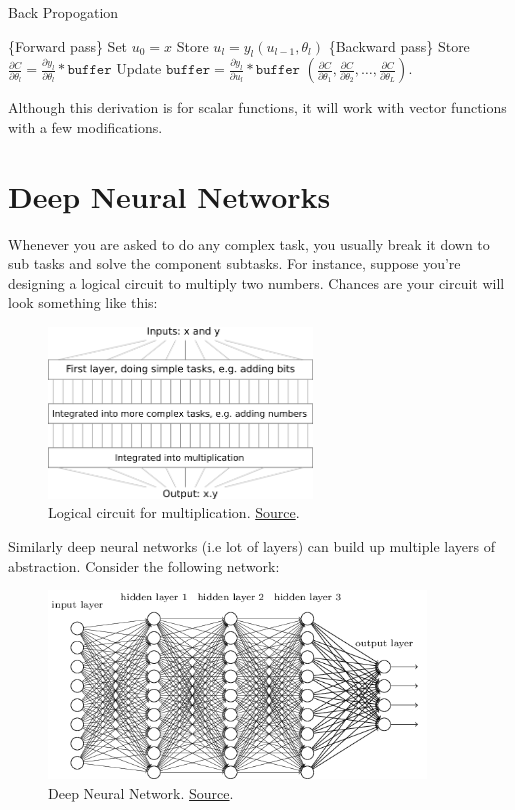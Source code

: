 \documentclass[a4paper]{tufte-handout}
\begin{document}
\begin{algorithm}[H]
\caption{Back Propogation}
\begin{algorithmic}[1]
  \STATE \{Forward pass\}
  \STATE Set \(u_0 = x\)
  	\STATE Store \(u_l = y_l(u_{l-1}, \theta_l)\)
  \ENDFOR
  \STATE \{Backward pass\}
  	\STATE Store \(\frac{\partial C}{\partial \theta_l} = \frac{\partial y_l}{\partial \theta_l} * \texttt{buffer}\)
  	\STATE Update \(\texttt{buffer} = \frac{\partial y_l}{\partial u_l} * \texttt{buffer}\)
  \ENDFOR 
  \RETURN \(\left(\frac{\partial C}{\partial\theta_1}, \frac{\partial C}{\partial\theta_2}, \ldots, \frac{\partial C}{\partial\theta_L}\right)\).
\end{algorithmic}
\end{algorithm}


Although this derivation is for scalar functions, it will work with
vector functions with a few modifications.

\section{Deep Neural Networks}\label{deep-neural-networks}

Whenever you are asked to do any complex task, you usually break it down
to sub tasks and solve the component subtasks. For instance, suppose
you're designing a logical circuit to multiply two numbers. Chances are
your circuit will look something like this:

\begin{figure}
\includegraphics[width=70mm]{circuit_multiplication}
\caption{Logical circuit for multiplication.
\href{http://neuralnetworksanddeeplearning.com/chap5.html\%22}{Source}.
}
\end{figure}

Similarly deep neural networks (i.e lot of layers) can build up multiple
layers of abstraction. Consider the following network:


\begin{figure}
\includegraphics[height=50mm]{tikz36}
\caption{Deep Neural Network.
\href{http://neuralnetworksanddeeplearning.com/chap5.html\%22}{Source}.}
\end{figure}
\end{document}
